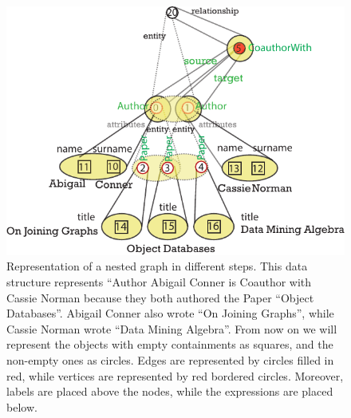 \begin{figure}
	\centering
	\includegraphics[width=\textwidth]{fig/04model/0405Full}
	\caption{Representation of a nested graph in different steps. This data structure represents ``Author Abigail Conner is Coauthor with Cassie Norman because they both authored the Paper ``Object Databases''. Abigail Conner also wrote ``On Joining Graphs'', while Cassie Norman wrote ``Data Mining Algebra''. From now on we will represent the objects with empty containments as squares, and the non-empty ones as circles. Edges are represented by circles filled in red, while vertices are represented by red bordered circles. Moreover, labels are placed above the nodes, while the expressions are placed below.}
	\label{fig:0405full}
\end{figure}

